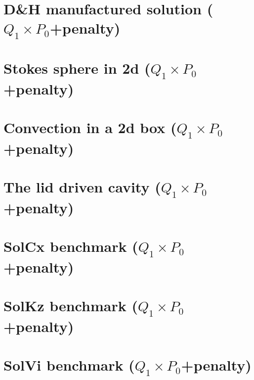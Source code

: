 \documentclass[a4paper,11pt]{report}
\begin{document}
\chapter{D\&H manufactured solution ($Q_1\times P_0$+penalty)\label{f01}} %

\chapter{Stokes sphere in 2d ($Q_1\times P_0$+penalty) \label{f02}} %

\chapter{Convection in a 2d box ($Q_1\times P_0$+penalty)\label{f03}} %

\chapter{The lid driven cavity ($Q_1\times P_0$+penalty) \label{f04}} %

\chapter{SolCx benchmark ($Q_1\times P_0$+penalty)\label{f05}} %

\chapter{SolKz benchmark ($Q_1\times P_0$+penalty)\label{f06}} %

\chapter{SolVi benchmark ($Q_1\times P_0$+penalty) \label{f07}} %
\end{document}
